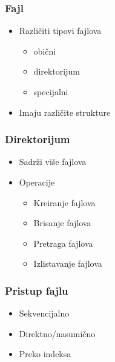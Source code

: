 \documentclass{beamer}
\begin{document}
\begin{frame}
    \frametitle{Fajl}
    \begin{itemize}
        \item Različiti tipovi fajlova \begin{itemize}
            \item obični \newline
            \item direktorijum \newline
            \item specijalni \newline
        \end{itemize}
        \item Imaju različite strukture \newline
    \end{itemize}
\end{frame}

\begin{frame}
    \frametitle{Direktorijum}
    \begin{itemize}
        \item Sadrži više fajlova \newline
        \item Operacije \begin{itemize}
            \item Kreiranje fajlova \newline
            \item Brisanje fajlova \newline
            \item Pretraga fajlova \newline
            \item Izlistavanje fajlova
        \end{itemize}
    \end{itemize}
\end{frame}

\begin{frame}
    \frametitle{Pristup fajlu}
    \begin{itemize}
        \item Sekvencijalno \newline
        \item Direktno/nasumično \newline
        \item Preko indeksa
    \end{itemize}
\end{frame}
\end{document}
